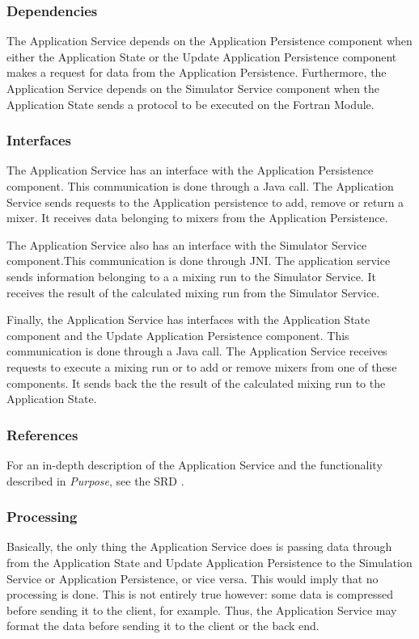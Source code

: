 \subsubsection*{Dependencies}
The Application Service depends on the Application Persistence component when either the Application State or the Update Application Persistence component makes a request for data from the Application Persistence. Furthermore, the Application Service depends on the Simulator Service component when the Application State sends a protocol to be executed on the Fortran Module.

\subsubsection*{Interfaces}
The Application Service has an interface with the Application Persistence component. This communication is done through a Java call. The Application Service sends requests to the Application persistence to add, remove or return a mixer. It receives data belonging to mixers from the Application Persistence.

The Application Service also has an interface with the Simulator Service component.This communication is done through JNI. The application service sends information belonging to a a mixing run to the Simulator Service. It receives the result of the calculated mixing run from the Simulator Service.

Finally, the Application Service has interfaces with the Application State component and the Update Application Persistence component. This communication is done through a Java call. The Application Service receives requests to execute a mixing run or to add or remove mixers from one of these components. It sends back the the result of the calculated mixing run to the Application State.

\subsubsection*{References}
For an in-depth description of the Application Service and the functionality described in \emph{Purpose}, see the SRD \cite{srd}.

\subsubsection*{Processing}
Basically, the only thing the Application Service does is passing data through from the Application State and Update Application Persistence to the Simulation Service or Application Persistence, or vice versa. This would imply that no processing is done. This is not entirely true however: some data is compressed before sending it to the client, for example. Thus, the Application Service may format the data before sending it to the client or the back end.

